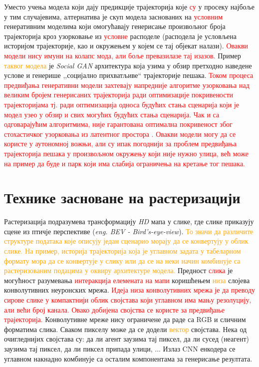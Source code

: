 \documentclass[11pt,oneside]{memoir}
\begin{document}
Уместо учења модела који дају предикције трајекторија које \textcolor{red}{су} у просеку најбоље у тим случајевима, 
алтернатива је скуп модела заснованих на \textcolor{red}{условним} генеративним моделима који
омогућавају генерисање произвољног броја трајекторија кроз узорковање из \textcolor{red}{условне} расподеле 
(расподела је условљена историјом трајекторије, као и окружењем у којем се тај објекат налази). \textcolor{red}{Овакви модели нису имуни на колапс мода,
али боље превазилазе тај изазов.}
Пример \textcolor{orange}{таквог модела} је \textit{Social GAN} \cite{social_gan} архитектура која узима у обзир претходно наведене услове и генерише ,,социјално прихватљиве`` 
трајекторије пешака. \textcolor{red}{Током процеса предвиђања генеративни модели захтевају напредније алгоритме узорковања над великим бројем генерисаних
трајекторија ради оптимизације покривености трајекторијама тј. ради оптимизација 
односа будућих стања сценарија који је модел узео у обзир и свих могућих будућих стања сценарија. Чак и са одговарајућим алгоритмима,
није гарантована оптимална покривеност због стохастичког узорковања из латентног простора \cite{tnt}. Овакви модели могу да се користе
у аутономној вожњи, али су ипак погоднији за
проблем предвиђања трајекторија пешака у произвољном окружењу који није нужно улица, већ може на пример да буде и парк који има слабија ограничења
на кретање тог пешака.}

\section{Технике засноване на растеризацији}

Растеризација подразумева трансформацију \textit{HD} мапа у слике, где слике приказују сцене из птичје 
перспективе (\textit{eng. BEV - Bird's-eye-view}). \textcolor{orange}{То значи да различите структуре података које описују један сценарио 
морају да се конвертују у облик слике. На пример, историја трајекторија која је углавном задата у табеларном формату мора да се конвертује 
у слику или да се на неки начин комбинује са растеризованим подацима у оквиру архитектуре модела.}
Предност \textcolor{red}{слика} је могућност разумевања \textcolor{red}{интеракција елемената на мапи} 
коришћењем \textcolor{orange}{низа} слојева конволутивних неуронских мрежа.
\textcolor{red}{Идеја низа конволутивних мрежа је да преводу сирове слике у компактнији облик својстава који углавном има мању резолуцију, 
али већи број канала. Овако добијена својства се користе за предвиђање трајекторија.}
Конволутивне мреже нису ограничене да раде са RGB и сличним форматима слика. Сваком пикселу може да се додели \textcolor{orange}{вектор} својстава. 
Нека од очигледнијих својстава су: да ли агент заузима тај пиксел, да ли сусед (неагент) заузима тај пиксел,
да ли пиксел припада улици, ... Излаз CNN енкодера се углавном накнадно комбинује са осталим компонентама за генерисање резултата. 
\end{document}
